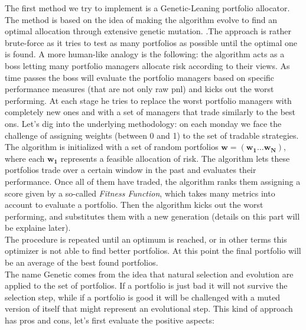 \documentclass[a4paper]{article}
\begin{document}
The first method we try to implement is a Genetic-Leaning portfolio allocator. The method is based on the idea of making the algorithm evolve to find an optimal allocation through extensive genetic mutation. .The approach is rather brute-force as it tries to test as many portfolios as possible until the optimal one is found. A more human-like analogy is the following: the algorithm acts as a boss letting many portfolio managers allocate risk according to their views. As time passes the boss will evaluate the portfolio managers based on specific performance measures (that are not only raw pnl) and kicks out the worst performing. At each stage he tries to replace the worst portfolio managers with completely new ones and with a set of managers that trade similarly to the best ons. Let's dig into the underlying methodology: on each monday we face the challenge of assigning weights (between 0 and 1) to the set of tradable strategies. The algorithm is initialized  with a set of random portfolios $\mathbf{w} = (\mathbf{w_1} \dots \mathbf{w_N})$, where each $\mathbf{w_1}$ represents a feasible allocation of risk. The algorithm lets these portfolios trade over a certain window in the past and evaluates their performance. Once all of them have traded, the algorithm ranks them assigning a score given by a so-called \textit{Fitness Function}, which takes many metrics into account to evaluate a portfolio. Then the algorithm kicks out the worst performing, and substitutes them with a new generation (details on this part will be explaine later).\\ The procedure is repeated until an optimum is reached, or in other terms this optimizer is not able to find better portfolios. At this point the final portfolio will be an average of the best found portfolios.\\
The name Genetic comes from the idea that natural selection and evolution are applied to the set of portfolios. If a portfolio is just bad it will not survive the selection step, while if a portfolio is good it will be challenged with a muted version of itself that might represent an evolutional step. This kind of approach has pros and cons, let's first evaluate the positive aspects:
\end{document}

